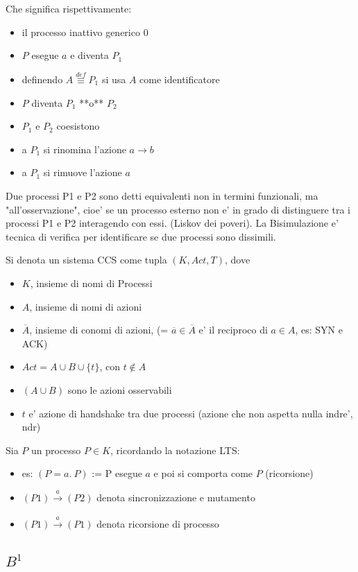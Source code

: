 Che significa rispettivamente:
\begin{itemize}
  \item il processo inattivo generico $0$
  \item $P$ esegue $a$ e diventa $P_1$
  \item definendo $A \stackrel{def}{\equiv} P_1$ si usa $A$ come identificatore
  \item $P$ diventa $P_1$ **o** $P_2$
  \item $P_1$ e $P_2$ coesistono
  \item a $P_1$ si rinomina l'azione $a \rightarrow b$
  \item a $P_1$ si rimuove l'azione $a$
\end{itemize}

Due processi P1 e P2 sono detti equivalenti non in termini funzionali, ma "all'osservazione", cioe' se un processo esterno non e' in grado di distinguere tra i processi P1 e P2 interagendo con essi. (Liskov dei poveri). La Bisimulazione e' tecnica di verifica per identificare se due processi sono dissimili.

Si denota un sistema CCS come tupla $(K, Act, T)$, dove
\begin{itemize}
  \item $K$, insieme di nomi di Processi
  \item $A$, insieme di nomi di azioni
  \item $\overline A$, insieme di conomi di azioni, (= $\overline a \in \overline A$ e' il reciproco di $a \in A$, es: SYN e ACK)
  \item $Act = A \cup B \cup \{t\}$, con $t \not \in A$
  \item $(A \cup B)$ sono le azioni osservabili
  \item $t$ e' azione di handshake tra due processi (azione che non aspetta nulla indre', ndr)
\end{itemize}

Sia $P$ un processo $P \in K$, ricordando la notazione LTS:
\begin{itemize}
  \item es: $(P = a . \ P)$ := P esegue $a$ e poi si comporta come $P$ (ricorsione)
  \item $(P1) \xrightarrow[]{a} (P2)$ denota sincronizzazione e mutamento
  \item $(P1) \xrightarrow[]{a} (P1)$ denota ricorsione di processo
\end{itemize}

\subsection{${B^1}$}

